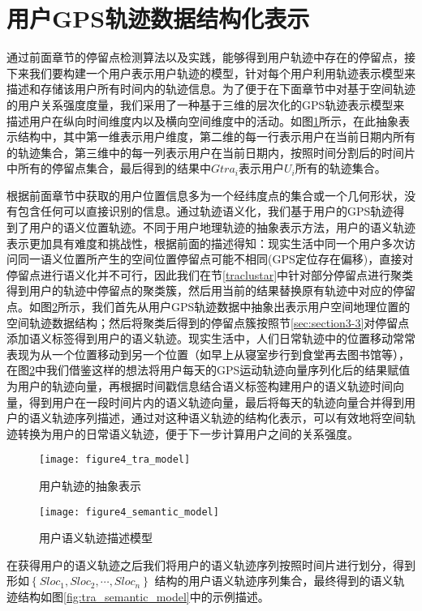 \section{用户GPS轨迹数据结构化表示}
\label{sec:section3-4}
通过前面章节的停留点检测算法以及实践，能够得到用户轨迹中存在的停留点，接下来我们要构建一个用户表示用户轨迹的模型，针对每个用户利用轨迹表示模型来描述和存储该用户所有时间内的轨迹信息。为了便于在下面章节中对基于空间轨迹的用户关系强度度量，我们采用了一种基于三维的层次化的GPS轨迹表示模型来描述用户在纵向时间维度内以及横向空间维度中的活动。如图\ref{fig:tramodel}所示，在此抽象表示结构中，其中第一维表示用户维度，第二维的每一行表示用户在当前日期内所有的轨迹集合，第三维中的每一列表示用户在当前日期内，按照时间分割后的时间片中所有的停留点集合，最后得到的结果中$Gtra_{i}$表示用户$U_{i}$所有的轨迹集合。
\par 根据前面章节中获取的用户位置信息多为一个经纬度点的集合或一个几何形状，没有包含任何可以直接识别的信息。通过轨迹语义化，我们基于用户的GPS轨迹得到了用户的语义位置轨迹。不同于用户地理轨迹的抽象表示方法，用户的语义轨迹表示更加具有难度和挑战性，根据前面的描述得知：现实生活中同一个用户多次访问同一语义位置所产生的空间位置停留点可能不相同(GPS定位存在偏移)，直接对停留点进行语义化并不可行，因此我们在节\ref{traclustar}中针对部分停留点进行聚类得到用户的轨迹中停留点的聚类簇，然后用当前的结果替换原有轨迹中对应的停留点。如图\ref{fig:semantic_model}所示，我们首先从用户GPS轨迹数据中抽象出表示用户空间地理位置的空间轨迹数据结构；然后将聚类后得到的停留点簇按照节\ref{sec:section3-3}对停留点添加语义标签得到用户的语义轨迹。现实生活中，人们日常轨迹中的位置移动常常表现为从一个位置移动到另一个位置（如早上从寝室步行到食堂再去图书馆等），在图\ref{fig:semantic_model}中我们借鉴这样的想法将用户每天的GPS运动轨迹向量序列化后的结果赋值为用户的轨迹向量，再根据时间戳信息结合语义标签构建用户的语义轨迹时间向量，得到用户在一段时间片内的语义轨迹向量，最后将每天的轨迹向量合并得到用户的语义轨迹序列描述，通过对这种语义轨迹的结构化表示，可以有效地将空间轨迹转换为用户的日常语义轨迹，便于下一步计算用户之间的关系强度。
\begin{figure}[htp]
\centering
\texttt{[image: figure4\_tra\_model]}
\caption{用户轨迹的抽象表示}
\label{fig:tramodel}
\end{figure}
\begin{figure}[htp]
\centering
\texttt{[image: figure4\_semantic\_model]}
\caption{用户语义轨迹描述模型}
\label{fig:semantic_model}
\end{figure}
\par 在获得用户的语义轨迹之后我们将用户的语义轨迹序列按照时间片进行划分，得到形如$\left \{Sloc_{1},Sloc_{2},\cdots ,Sloc_{n} \right \}$ 结构的用户语义轨迹序列集合，最终得到的语义轨迹结构如图\ref{fig:tra_semantic_model}中的示例描述。
